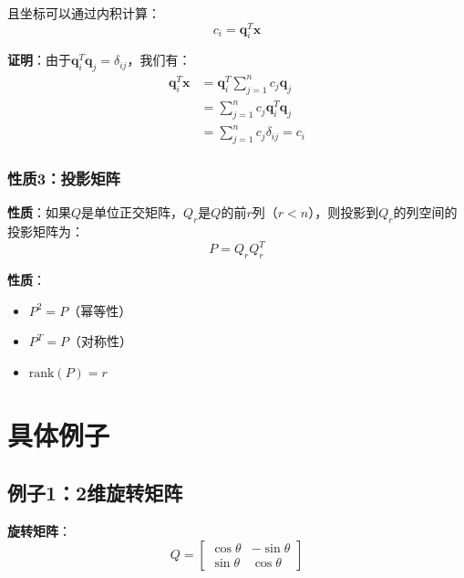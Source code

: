 \documentclass[12pt,a4paper]{article}
\begin{document}
且坐标可以通过内积计算：
\begin{equation}
c_i = \bm{q}_i^T \bm{x}
\end{equation}

\textbf{证明}：由于$\bm{q}_i^T \bm{q}_j = \delta_{ij}$，我们有：
\begin{align}
\bm{q}_i^T \bm{x} &= \bm{q}_i^T \sum_{j=1}^n c_j \bm{q}_j \\
&= \sum_{j=1}^n c_j \bm{q}_i^T \bm{q}_j \\
&= \sum_{j=1}^n c_j \delta_{ij} = c_i
\end{align}

\subsubsection{性质3：投影矩阵}

\textbf{性质}：如果$Q$是单位正交矩阵，$Q_r$是$Q$的前$r$列（$r < n$），则投影到$Q_r$的列空间的投影矩阵为：
\begin{equation}
P = Q_r Q_r^T
\end{equation}

\textbf{性质}：
\begin{itemize}
\item $P^2 = P$（幂等性）
\item $P^T = P$（对称性）
\item $\text{rank}(P) = r$
\end{itemize}

\section{具体例子}

\subsection{例子1：2维旋转矩阵}

\textbf{旋转矩阵}：
\begin{equation}
Q = \begin{bmatrix} \cos\theta & -\sin\theta \\ \sin\theta & \cos\theta \end{bmatrix}
\end{equation}
\end{document}
